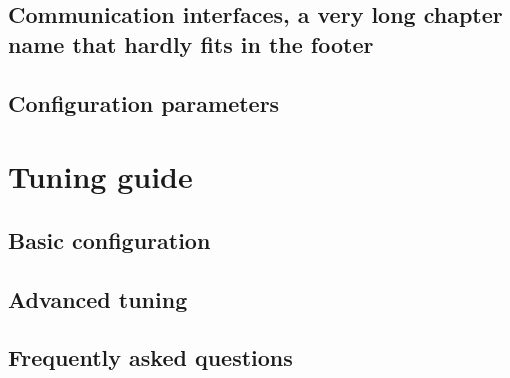 \documentclass[a4paper,onecolumn,openany]{book}
\begin{document}
\lipsum

\chapter{Communication interfaces, a very long chapter name that hardly fits in the footer}

\lipsum

\chapter{Configuration parameters}

\lipsum

\part{Tuning guide}

\chapter{Basic configuration}

\lipsum

\chapter{Advanced tuning}

\lipsum

\chapter{Frequently asked questions}

\lipsum
\end{document}
